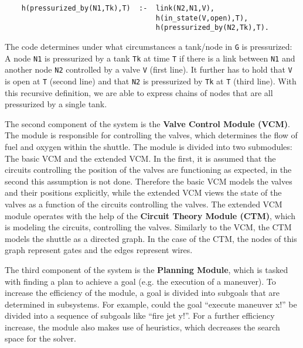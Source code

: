 \documentclass[runningheads]{llncs}
\begin{document}
\begin{verbatim}
    h(pressurized_by(N1,Tk),T)  :-  link(N2,N1,V),
                                    h(in_state(V,open),T),
                                    h(pressurized_by(N2,Tk),T).
\end{verbatim}
    
The code determines under what circumstances a tank/node in \verb|G| is pressurized: A node \verb|N1| is pressurized by a tank \verb|Tk| at time \verb|T| if there is a link between \verb|N1| and another node \verb|N2| controlled by a valve \verb|V| (first line). It further has to hold that \verb|V| is open at \verb|T| (second line) and that \verb|N2| is pressurized by \verb|Tk| at \verb|T| (third line). With this recursive definition, we are able to express chains of nodes that are all pressurized by a single tank. 

The second component of the system is the \textbf{Valve Control Module (VCM)}. The module is responsible for controlling the valves, which determines the flow of fuel and oxygen within the shuttle. The module is divided into two submodules: The basic VCM and the extended VCM. In the first, it is assumed that the circuits controlling the position of the valves are functioning as expected, in the second this assumption is not done. Therefore the basic VCM models the valves and their positions explicitly, while the extended VCM views the state of the valves as a function of the circuits controlling the valves. The extended VCM module operates with the help of the \textbf{Circuit Theory Module (CTM)}, which is modeling the circuits, controlling the valves. Similarly to the VCM, the CTM models the shuttle as a directed graph. In the case of the CTM, the nodes of this graph represent gates and the edges represent wires. 

The third component of the system is the \textbf{Planning Module}, which is tasked with finding a plan to achieve a goal (e.g. the execution of a maneuver). To increase the efficiency of the module, a goal is divided into subgoals that are determined in subsystems. For example, could the goal ``execute maneuver x!'' be divided into a sequence of subgoals like ``fire jet y!''. For a further efficiency increase, the module also makes use of heuristics, which decreases the search space for the solver. 
\end{document}
